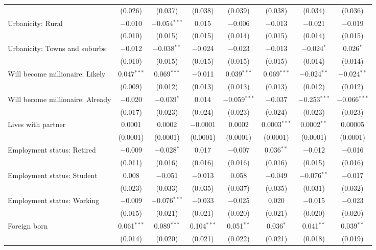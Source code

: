 \begin{tabular}{@{\extracolsep{5pt}}lccccccc}
  & (0.026) & (0.037) & (0.038) & (0.039) & (0.038) & (0.034) & (0.036) \\ 
  Urbanicity: Rural & $-$0.010 & $-$0.054$^{***}$ & 0.015 & $-$0.006 & $-$0.013 & $-$0.021 & $-$0.019 \\ 
  & (0.010) & (0.015) & (0.015) & (0.014) & (0.015) & (0.014) & (0.015) \\ 
  Urbanicity: Towns and suburbs & $-$0.012 & $-$0.038$^{**}$ & $-$0.024 & $-$0.023 & $-$0.013 & $-$0.024$^{*}$ & 0.026$^{*}$ \\ 
  & (0.010) & (0.015) & (0.015) & (0.015) & (0.015) & (0.014) & (0.014) \\ 
  Will become millionaire: Likely & 0.047$^{***}$ & 0.069$^{***}$ & $-$0.011 & 0.039$^{***}$ & 0.069$^{***}$ & $-$0.024$^{**}$ & $-$0.024$^{**}$ \\ 
  & (0.009) & (0.012) & (0.013) & (0.013) & (0.013) & (0.012) & (0.012) \\ 
  Will become millionaire: Already & $-$0.020 & $-$0.039$^{*}$ & 0.014 & $-$0.059$^{***}$ & $-$0.037 & $-$0.253$^{***}$ & $-$0.066$^{***}$ \\ 
  & (0.017) & (0.023) & (0.024) & (0.023) & (0.024) & (0.023) & (0.023) \\ 
  Lives with partner & 0.0001 & 0.0002 & $-$0.0001 & 0.0002 & 0.0003$^{***}$ & 0.0002$^{**}$ & 0.00005 \\ 
  & (0.0001) & (0.0001) & (0.0001) & (0.0001) & (0.0001) & (0.0001) & (0.0001) \\ 
  Employment status: Retired & $-$0.009 & $-$0.028$^{*}$ & 0.017 & $-$0.007 & 0.036$^{**}$ & $-$0.012 & $-$0.016 \\ 
  & (0.011) & (0.016) & (0.016) & (0.016) & (0.016) & (0.015) & (0.016) \\ 
  Employment status: Student & 0.008 & $-$0.051 & $-$0.013 & 0.058 & $-$0.049 & $-$0.076$^{**}$ & $-$0.017 \\ 
  & (0.023) & (0.033) & (0.035) & (0.037) & (0.035) & (0.031) & (0.032) \\ 
  Employment status: Working & $-$0.009 & $-$0.076$^{***}$ & $-$0.033 & $-$0.025 & 0.020 & $-$0.015 & $-$0.023 \\ 
  & (0.015) & (0.021) & (0.021) & (0.020) & (0.021) & (0.020) & (0.020) \\ 
  Foreign born & 0.061$^{***}$ & 0.089$^{***}$ & 0.104$^{***}$ & 0.051$^{**}$ & 0.036$^{*}$ & 0.041$^{**}$ & 0.039$^{**}$ \\ 
  & (0.014) & (0.020) & (0.021) & (0.022) & (0.021) & (0.018) & (0.019) \\ 

\end{tabular}
